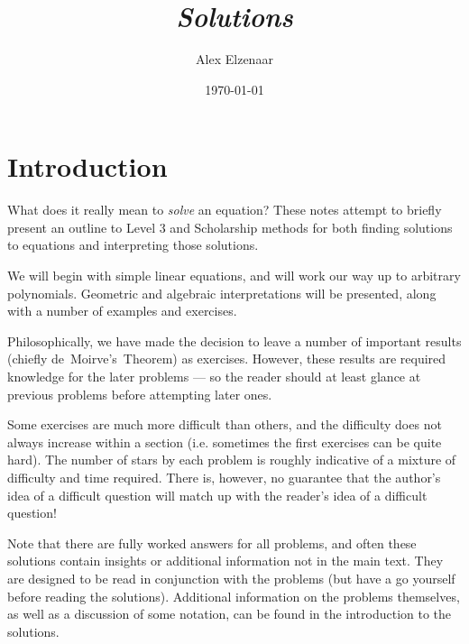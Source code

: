 \documentclass[a4paper,10pt,titlepage]{article}
\title{\textbf{\textit{Solutions}}}
\author{Alex Elzenaar}%
\date{\today}
\theoremstyle{definition}
\begin{document}
\setcounter{tocdepth}{1}
\maketitle
\newpage\null\thispagestyle{empty}\newpage
{}

\tableofcontents

\let\oldsection\section
\renewcommand\section{\clearpage\oldsection}

\section{Introduction}
What does it really mean to \emph{solve} an equation? These notes attempt
to briefly present an outline to Level 3 and Scholarship methods for both finding
solutions to equations and interpreting those solutions.

We will begin with simple linear equations, and will work our way up to arbitrary
polynomials. Geometric and algebraic interpretations will be presented, along with
a number of examples and exercises.

Philosophically, we have made the decision to leave a number of important results
(chiefly de~Moirve's~Theorem) as exercises. However, these results are required
knowledge for the later problems --- so the reader should at least glance at previous
problems before attempting later ones.

Some exercises are much more difficult than others, and the difficulty does not
always increase within a section (i.e. sometimes the first exercises can be quite
hard). The number of stars by each problem is roughly indicative of a mixture of
difficulty and time required. There is, however, no guarantee that the author's
idea of a difficult question will match up with the reader's idea of a difficult
question!

Note that there are fully worked answers for all problems, and often these solutions
contain insights or additional information not in the main text. They are designed to
be read in conjunction with the problems (but have a go yourself before reading the
solutions). Additional information on the problems themselves, as well as a discussion
of some notation, can be found in the introduction to the solutions.
\end{document}
